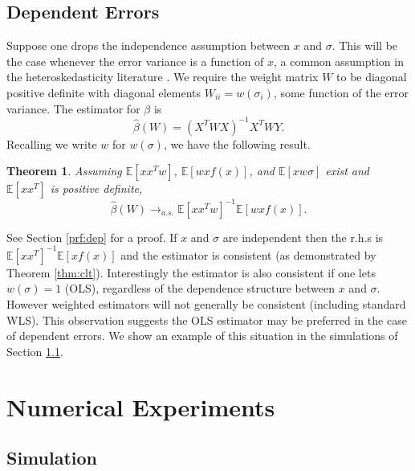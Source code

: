 \documentclass[ejs,ps,preprint]{imsart}
\numberwithin{equation}{section}
\theoremstyle{plain}
\newtheorem{thm}{Theorem}[section]
\newcommand{\E}{\mathbb{E}}
\def\E{\mathbb{E}}
\begin{document}
\subsection{Dependent Errors}
\label{sec:dependent}

Suppose one drops the independence assumption between $x$ and $\sigma$. This will be the case whenever the error variance is a function of $x$, a common assumption in the heteroskedasticity literature \cite{carroll1982adapting,carroll1982robust,jobson1980least}. We require the weight matrix $W$ to be diagonal positive definite with diagonal elements $W_{ii} = w(\sigma_i)$, some function of the error variance. The estimator for $\beta$ is 
\begin{equation*}
\widehat{\beta}(W) = (X^TWX)^{-1}X^TWY.
\end{equation*}
Recalling we write $w$ for $w(\sigma)$, we have the following result.
\begin{thm}
\label{thm:dep}
Assuming $\E[xx^Tw]$, $\E[wxf(x)]$, and $\E[xw\sigma]$ exist and $\E[xx^T]$ is positive definite,
\begin{equation}
  \label{eq:dep_errors}
\widehat{\beta}(W) \rightarrow_{a.s.} \E[xx^T w]^{-1}\E[wxf(x)].
\end{equation}
\end{thm}
See Section \ref{prf:dep} for a proof. If $x$ and $\sigma$ are independent then the r.h.s is $\E[xx^T]^{-1}\E[xf(x)]$ and the estimator is consistent (as demonstrated by Theorem \ref{thm:clt}). Interestingly the estimator is also consistent if one lets $w(\sigma) = 1$ (OLS), regardless of the dependence structure between $x$ and $\sigma$. However weighted estimators will not generally be consistent (including standard WLS). This observation suggests the OLS estimator may be preferred in the case of dependent errors. We show an example of this situation in the simulations of Section \ref{sec:sim}.


\section{Numerical Experiments}
\label{sec:period}

\subsection{Simulation}
\label{sec:sim}
\end{document}
